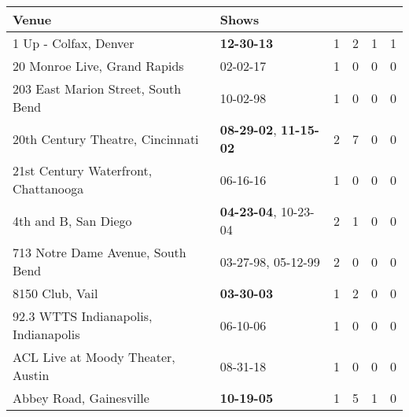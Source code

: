 \begin{longtable}{p{}p{}p{}p{}p{}p{}}
                                                               \textbf{Venue} & \multicolumn{5}{l}{\textbf{Shows}} \\
\midrule
\endhead 
                                                        1 Up - Colfax, Denver &                                       \textbf{12-30-13\textsuperscript{}} &  1 &  2 &  1 &  1 \\
                                                 20 Monroe Live, Grand Rapids &                                                02-02-17\textsuperscript{} &  1 &  0 &  0 &  0 \\
                                           203 East Marion Street, South Bend &                                                10-02-98\textsuperscript{} &  1 &  0 &  0 &  0 \\
                                             20th Century Theatre, Cincinnati &  \textbf{08-29-02\textsuperscript{}}, \textbf{11-15-02\textsuperscript{}} &  2 &  7 &  0 &  0 \\
                                         21st Century Waterfront, Chattanooga &                                                06-16-16\textsuperscript{} &  1 &  0 &  0 &  0 \\
                                                         4th and B, San Diego &           \textbf{04-23-04\textsuperscript{}}, 10-23-04\textsuperscript{} &  2 &  1 &  0 &  0 \\
                                            713 Notre Dame Avenue, South Bend &                    03-27-98\textsuperscript{}, 05-12-99\textsuperscript{} &  2 &  0 &  0 &  0 \\
                                                              8150 Club, Vail &                                       \textbf{03-30-03\textsuperscript{}} &  1 &  2 &  0 &  0 \\
                                         92.3 WTTS Indianapolis, Indianapolis &                                                06-10-06\textsuperscript{} &  1 &  0 &  0 &  0 \\
                                            ACL Live at Moody Theater, Austin &                                                08-31-18\textsuperscript{} &  1 &  0 &  0 &  0 \\
                                                      Abbey Road, Gainesville &                                       \textbf{10-19-05\textsuperscript{}} &  1 &  5 &  1 &  0 \\

\end{longtable}
